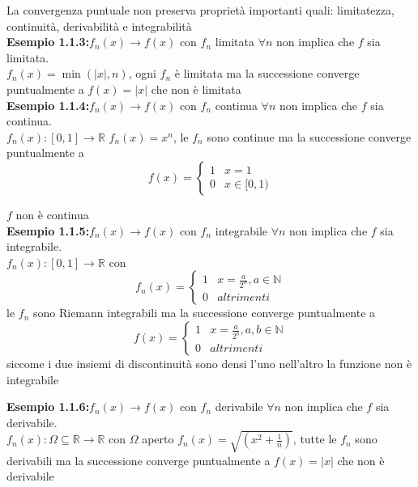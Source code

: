 \documentclass[a4paper,11pt,titlepage]{book}
\begin{document}
La convergenza puntuale non preserva proprietà importanti quali:  limitatezza, continuità, derivabilità e integrabilità \\

\textbf{Esempio 1.1.3:}$f_{n}(x)\to f(x)$ con $f_n$ limitata $ \forall n$ non implica che $f$ sia limitata.\\

$f_{n}(x)=\min(|x|,n)$, ogni $f_{n}$ è limitata ma la successione converge puntualmente a $f(x)=|x|$ che non è limitata\\

\textbf{Esempio 1.1.4:}$f_{n}(x)\to f(x)$ con $f_n$ continua $ \forall n$ non implica che $f$ sia continua.\\

 $f_{n}(x):[0,1]\rightarrow\mathbb{R}$ $f_{n}(x)=x^n$, le $f_{n}$ sono continue ma la successione converge puntualmente a $$f(x)=
\begin{cases}
 1 &  x=1 \\ 
0 & x\in [0,1)
\end{cases}$$

$f$ non è continua \\

\textbf{Esempio 1.1.5:}$f_{n}(x)\to f(x)$ con $f_n$ integrabile $ \forall n$ non implica che $f$ sia integrabile.\\ 

$f_{n}(x):[0,1]\rightarrow\mathbb{R}$ con $$f_{n}(x)=
\begin{cases}
 1 &  x=\frac{a}{2^n}, a\in \mathbb{N}  \\ 
0 & altrimenti
\end{cases}$$
le $f_n$ sono Riemann integrabili ma la successione converge puntualmente a 
$$f(x)=
\begin{cases}
 1 &  x=\frac{a}{2^b}, a,b\in \mathbb{N}  \\ 
0 & altrimenti
\end{cases}$$
siccome i due insiemi di discontinuità sono densi l'uno nell'altro la funzione non è integrabile

\textbf{Esempio 1.1.6:}$f_{n}(x)\to f(x)$ con $f_n$ derivabile $ \forall n$ non implica che $f$ sia derivabile.\\

$f_{n}(x):\Omega\subseteq\mathbb{R}\rightarrow\mathbb{R}$ con $\Omega$ aperto $f_{n}(x)=\sqrt{(x^2+\frac{1}{n})}$, tutte le $f_n$ sono derivabili ma la successione converge puntualmente a $f(x)=|x|$ che non è derivabile \\
\end{document}
